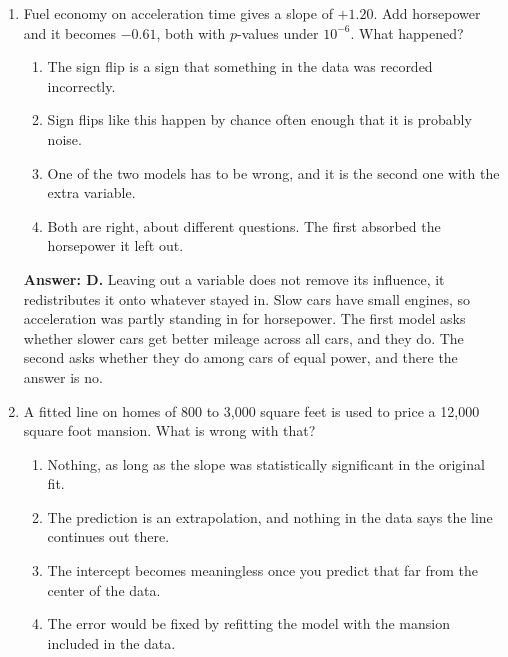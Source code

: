 \documentclass[11pt]{article}
\begin{document}
\begin{enumerate}[itemsep=14pt]
\vspace{2pt}
\textbf{Answer: C.} This is the most common misreading of an interaction model. With the interaction in, the two groups get different slopes: $b_1$ for the baseline group and $b_1 + b_3$ for the other. Quoting $b_1$ as the overall slope reports one group's answer as if it applied to everyone.
\vspace{4pt}

\item Fuel economy on acceleration time gives a slope of $+1.20$. Add horsepower and it becomes $-0.61$, both with $p$-values under $10^{-6}$. What happened?

\begin{enumerate}[label=\Alph*., itemsep=1pt, topsep=3pt]
  \item The sign flip is a sign that something in the data was recorded incorrectly.
  \item Sign flips like this happen by chance often enough that it is probably noise.
  \item One of the two models has to be wrong, and it is the second one with the extra variable.
  \item Both are right, about different questions. The first absorbed the horsepower it left out.
\end{enumerate}

\vspace{2pt}
\textbf{Answer: D.} Leaving out a variable does not remove its influence, it redistributes it onto whatever stayed in. Slow cars have small engines, so acceleration was partly standing in for horsepower. The first model asks whether slower cars get better mileage across all cars, and they do. The second asks whether they do among cars of equal power, and there the answer is no.
\vspace{4pt}

\item A fitted line on homes of 800 to 3,000 square feet is used to price a 12,000 square foot mansion. What is wrong with that?

\begin{enumerate}[label=\Alph*., itemsep=1pt, topsep=3pt]
  \item Nothing, as long as the slope was statistically significant in the original fit.
  \item The prediction is an extrapolation, and nothing in the data says the line continues out there.
  \item The intercept becomes meaningless once you predict that far from the center of the data.
  \item The error would be fixed by refitting the model with the mansion included in the data.
\end{enumerate}


\end{enumerate}
\end{document}
